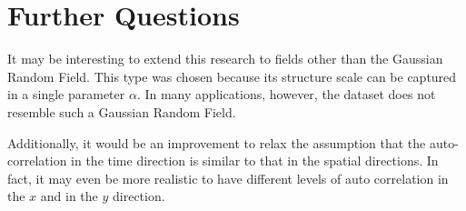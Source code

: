 \documentclass{acm_proc_article-sp}
\begin{document}
\section{Further Questions}
\label{Further Questions}

It may be interesting to extend this research to fields other than the Gaussian Random Field. This type was chosen because its structure scale can be captured in a single parameter $\alpha$. In many applications, however, the dataset does not resemble such a Gaussian Random Field.

Additionally, it would be an improvement to relax the assumption that the auto-correlation in the time direction is similar to that in the spatial directions. In fact, it may even be more realistic to have different levels of auto correlation in the $x$ and in the $y$ direction.

{
\footnotesize


}
\end{document}
